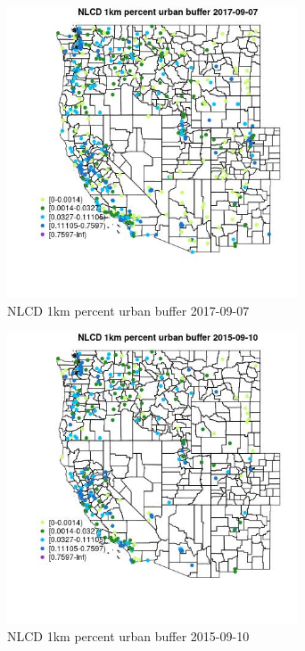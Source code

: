 \begin{figure} 
\centering  
\includegraphics[width=0.77\textwidth]{Code_Outputs/Report_ML_input_PM25_Step4_part_e_de_duplicated_aves_compiled_2019-05-21wNAs_MapObsNLCD_1km_percent_urban_buffer2017-09-07.jpg} 
\caption{\label{fig:Report_ML_input_PM25_Step4_part_e_de_duplicated_aves_compiled_2019-05-21wNAsMapObsNLCD_1km_percent_urban_buffer2017-09-07}NLCD 1km percent urban buffer 2017-09-07} 
\end{figure} 
 

\begin{figure} 
\centering  
\includegraphics[width=0.77\textwidth]{Code_Outputs/Report_ML_input_PM25_Step4_part_e_de_duplicated_aves_compiled_2019-05-21wNAs_MapObsNLCD_1km_percent_urban_buffer2015-09-10.jpg} 
\caption{\label{fig:Report_ML_input_PM25_Step4_part_e_de_duplicated_aves_compiled_2019-05-21wNAsMapObsNLCD_1km_percent_urban_buffer2015-09-10}NLCD 1km percent urban buffer 2015-09-10} 
\end{figure} 
 

